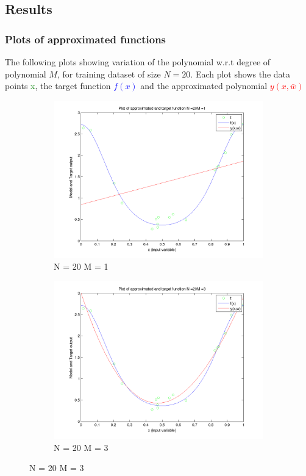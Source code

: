 \documentclass{article}
\begin{document}
\subsection{Results}

\subsubsection{Plots of approximated functions}

The following plots showing variation of the polynomial w.r.t degree of polynomial $M$, for training dataset of size $N = 20$. Each plot shows the data points \textcolor{green}{x}, the target function \textcolor{blue}{$f(x)$}  and the approximated polynomial \textcolor{red}{$y(x,\bar{w})$} 
\begin{figure}[H]

\begin{subfigure}{.5\textwidth}
\centering
\includegraphics[width=\linewidth]{VaryingM_N20M1}
\caption{N = 20 M = 1}
\end{subfigure}
\begin{subfigure}{.5\textwidth}
\includegraphics[width=\linewidth]{VaryingM_N20M3}
\caption{N = 20 M = 3}
\end{subfigure}



\end{figure}
\end{document}
